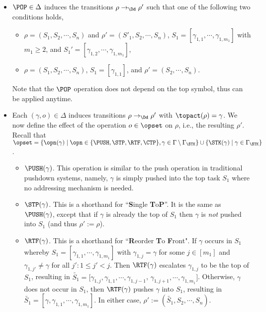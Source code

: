 \begin{itemize}
\item $\POP \in \Delta$ induces the transitions $\rho\rightarrow_\Dd \rho'$ such that one of the following two conditions holds,
\begin{itemize}
\item  $\rho = (S_1, S_2, \cdots, S_n)$ and $\rho' = (S'_1, S_2, \cdots, S_n)$, $S_1 = [\gamma_{1, 1}, \cdots, \gamma_{1, m_1}]$ with $m_1 \ge 2$, and $S_1' = [\gamma_{1, 2}, \cdots, \gamma_{1, m_1}]$, 
%
\item $\rho = (S_1, S_2, \cdots, S_n)$, $S_1 = [\gamma_{1,1}]$, and $\rho' = (S_2, \cdots, S_n)$.
\end{itemize}
Note that the $\POP$ operation does not depend on the top symbol, thus can be applied anytime.

\item Each $(\gamma, o)\in \Delta$ induces transitions $\rho\rightarrow_\Dd \rho'$ with $\topact(\rho)=\gamma$. We now define the effect of the operation $o\in \opset$ on $\rho$, i.e., the resulting $\rho'$. 
    Recall that $\opset=\{\opn(\gamma)\mid \opn \in \{\PUSH, \STP, \RTF, \CTP\}, \gamma \in \Gamma\setminus\Gamma_\STK \} \cup \{\STK(\gamma)\mid \gamma\in\Gamma_\STK\}$.
\begin{itemize}
	\item $\PUSH(\gamma)$. This operation is similar to the push operation in traditional pushdown systems, namely, $\gamma$ is simply pushed into the top task $S_1$ where no addressing mechanism is needed.	 
  	\item $\STP(\gamma)$. This is a shorthand for ``\textbf{S}ingle \textbf{T}o\textbf{P}''. It is the same as $\PUSH(\gamma)$, except that if $\gamma$ is already the top of $S_1$ then $\gamma$ is \emph{not} pushed into $S_1$ (and thus $\rho':=\rho$). 
	\item $\RTF(\gamma)$. This is a shorthand for ``\textbf{R}eorder \textbf{T}o \textbf{F}ront". If $\gamma$ occurs in $S_1$ whereby $S_1=[\gamma_{1,1}, \cdots, \gamma_{1,m_1}]$ with $\gamma_{1,j} =\gamma$ for some $j \in [m_1]$  and $\gamma_{1, j'} \neq \gamma$ for all $j': 1 \le j' < j$. Then $\RTF(\gamma)$ escalates $\gamma_{1,j}$ to be the top of $S_1$, resulting in  
	$\widetilde{S_1} = [\gamma_{1,j}, \gamma_{1,1}, \cdots, \gamma_{1,j-1}$, $\gamma_{1,j+1}, \cdots, \gamma_{1,m_1}]$.
	Otherwise, $\gamma$ does not occur in $S_1$, then $\RTF(\gamma)$ pushes $\gamma$ into $S_1$, resulting in $\widetilde{S_1} = [\gamma, \gamma_{1,1}, \cdots, \gamma_{1,m_1}]$. In either case,  $\rho':=(\widetilde{S_1}, S_2, \cdots, S_n)$.
	

\end{itemize}
\end{itemize}
